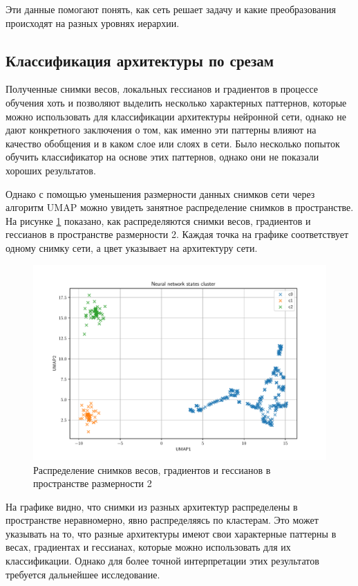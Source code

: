 \documentclass[a4paper,12pt]{article}
\begin{document}
Эти данные помогают понять, как сеть решает задачу и какие преобразования происходят на разных уровнях иерархии.

\subsection{Классификация архитектуры по срезам}

Полученные снимки весов, локальных гессианов и градиентов в процессе обучения хоть и позволяют выделить
несколько характерных паттернов, которые можно использовать для классификации архитектуры нейронной сети,
однако не дают конкретного заключения о том, как именно эти паттерны влияют на качество обобщения и в каком
слое или слоях в сети. Было несколько попыток обучить классификатор на основе этих паттернов, однако они не
показали хороших результатов.

Однако с помощью уменьшения размерности данных снимков сети через алгоритм UMAP можно увидеть занятное
распределение снимков в пространстве. На рисунке \ref{fig:umap} показано, как распределяются снимки весов,
градиентов и гессианов в пространстве размерности 2. Каждая точка на графике соответствует одному снимку
сети, а цвет указывает на архитектуру сети.
\begin{figure}[ht]
  \centering
  \includegraphics[width=1\linewidth]{resources/umap.pdf}
  \caption{Распределение снимков весов, градиентов и гессианов в пространстве размерности 2}
  \label{fig:umap}
\end{figure}

На графике видно, что снимки из разных архитектур распределены в пространстве неравномерно, явно
распределяясь по кластерам. Это может указывать на то, что разные архитектуры имеют свои характерные паттерны
в весах, градиентах и гессианах, которые можно использовать для их классификации. Однако для более точной
интерпретации этих результатов требуется дальнейшее исследование.
\end{document}
